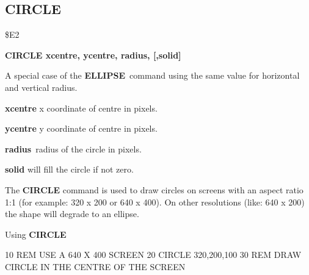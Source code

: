 \subsection{CIRCLE}
\begin{description}[leftmargin=3cm,style=nextline]
\item [Token:] \$E2
\item [Format:] {\bf CIRCLE xcentre, ycentre, radius, [,solid]}
\item [Usage:] A special case of
               the {\bf ELLIPSE} command using the same value for
               horizontal and vertical radius.

               {\bf xcentre} x coordinate of centre in pixels.

               {\bf ycentre} y coordinate of centre in pixels.

               {\bf radius} radius of the circle in pixels.

               {\bf solid} will fill the circle if not zero.

\item [Remarks:] The {\bf CIRCLE} command is used to draw circles on
               screens with an aspect ratio 1:1 (for example: 320 x 200
               or 640 x 400). On other resolutions (like: 640 x 200)
               the shape will degrade to an ellipse.

\item [Example:] Using {\bf CIRCLE}
\begin{screenoutput}
10 REM USE A 640 X 400 SCREEN
20 CIRCLE 320,200,100
30 REM DRAW CIRCLE IN THE CENTRE OF THE SCREEN
\end{screenoutput}
\end{description}


\newpage

